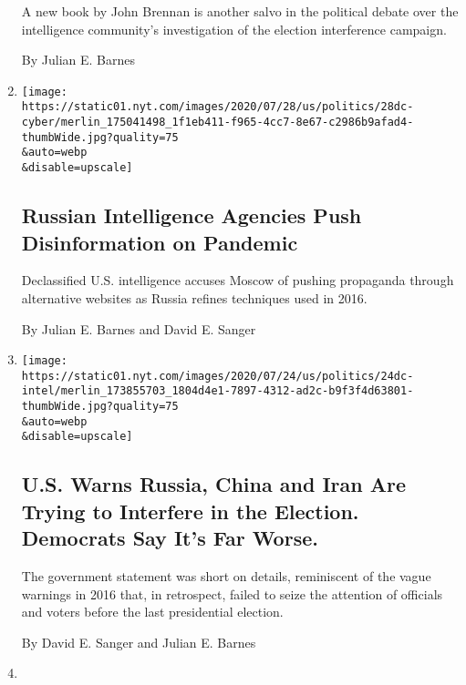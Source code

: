 \begin{enumerate}
  A new book by John Brennan is another salvo in the political debate
  over the intelligence community's investigation of the election
  interference campaign.

  By Julian E. Barnes
\item
  \href{/2020/07/28/us/politics/russia-disinformation-coronavirus.html}{}

  \texttt{[image: https://static01.nyt.com/images/2020/07/28/us/politics/28dc-cyber/merlin\_175041498\_1f1eb411-f965-4cc7-8e67-c2986b9afad4-thumbWide.jpg?quality=75\\\&auto=webp\\\&disable=upscale]}

  \hypertarget{russian-intelligence-agencies-push-disinformation-on-pandemic}{%
  \subsection{Russian Intelligence Agencies Push Disinformation on
  Pandemic}\label{russian-intelligence-agencies-push-disinformation-on-pandemic}}

  Declassified U.S. intelligence accuses Moscow of pushing propaganda
  through alternative websites as Russia refines techniques used in
  2016.

  By Julian E. Barnes and David E. Sanger
\item
  \href{/2020/07/24/us/politics/election-interference-russia-china-iran.html}{}

  \texttt{[image: https://static01.nyt.com/images/2020/07/24/us/politics/24dc-intel/merlin\_173855703\_1804d4e1-7897-4312-ad2c-b9f3f4d63801-thumbWide.jpg?quality=75\\\&auto=webp\\\&disable=upscale]}

  \hypertarget{us-warns-russia-china-and-iran-are-trying-to-interfere-in-the-election-democrats-say-its-far-worse}{%
  \subsection{U.S. Warns Russia, China and Iran Are Trying to Interfere
  in the Election. Democrats Say It's Far
  Worse.}\label{us-warns-russia-china-and-iran-are-trying-to-interfere-in-the-election-democrats-say-its-far-worse}}

  The government statement was short on details, reminiscent of the
  vague warnings in 2016 that, in retrospect, failed to seize the
  attention of officials and voters before the last presidential
  election.

  By David E. Sanger and Julian E. Barnes
\item
  \href{/2020/07/23/us/politics/dji-drones-security-vulnerability.html}{}


\end{enumerate}

